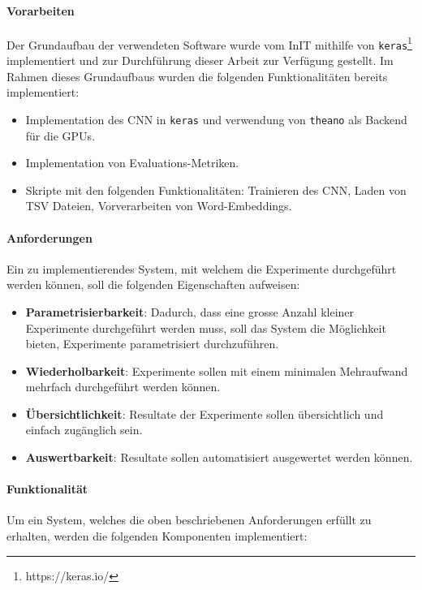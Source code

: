 \paragraph{Vorarbeiten}
\label{technichal_setup:prework}
Der Grundaufbau der verwendeten Software wurde vom InIT mithilfe von \texttt{keras}\footnote{https://keras.io/} implementiert und zur Durchführung dieser Arbeit zur Verfügung gestellt. Im Rahmen dieses Grundaufbaus wurden die folgenden Funktionalitäten bereits implementiert:

\begin{itemize}[noitemsep]
	\item Implementation des CNN in \texttt{keras} und verwendung von \texttt{theano} \cite{theanoCitShort} als Backend für die \gls{GPU}s.
	\item Implementation von Evaluations-Metriken.
	\item Skripte mit den folgenden Funktionalitäten: Trainieren des CNN, Laden von TSV Dateien, Vorverarbeiten von Word-Embeddings.
\end{itemize}

\paragraph{Anforderungen}
\label{technical_setup:requirements}
Ein zu implementierendes System, mit welchem die Experimente durchgeführt werden können, soll die folgenden Eigenschaften aufweisen:

\begin{itemize}
	\item \textbf{Parametrisierbarkeit}: Dadurch, dass eine grosse Anzahl kleiner Experimente durchgeführt werden muss, soll das System die Möglichkeit bieten, Experimente parametrisiert durchzuführen.
	\item \textbf{Wiederholbarkeit}: Experimente sollen mit einem minimalen Mehraufwand mehrfach durchgeführt werden können.
	\item \textbf{Übersichtlichkeit}: Resultate der Experimente sollen übersichtlich und einfach zugänglich sein.
	\item \textbf{Auswertbarkeit}: Resultate sollen automatisiert ausgewertet werden können.
\end{itemize}

\paragraph{Funktionalität}
\label{technical_setup:functionality}
Um ein System, welches die oben beschriebenen Anforderungen erfüllt zu erhalten, werden die folgenden Komponenten implementiert:

